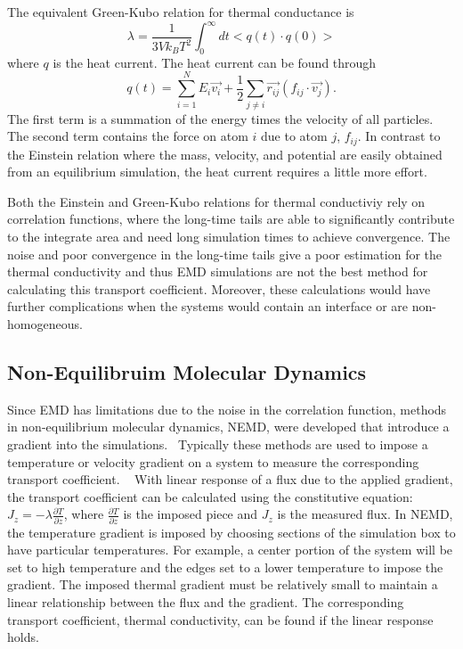 The equivalent Green-Kubo relation for thermal conductance is
\begin{equation}
    \lambda = \frac{1}{3Vk_BT^2}\int^\infty_0 dt <q(t) \cdot q(0)>
\end{equation}
where $q$ is the heat current.
The heat current can be found through
\begin{equation}
    q(t) = \sum^N_{i=1} E_i \vec{v_i} + \frac{1}{2}\sum_{j \neq i} \vec{r_{ij}} (f_{ij} \cdot \vec{v_j}).
\end{equation}
The first term is a summation of the energy times the velocity of all particles. The second term contains the force on atom $i$ due to atom $j$, $f_{ij}$.
In contrast to the Einstein relation where the mass, velocity, and potential are easily obtained from an equilibrium simulation, the heat current requires a little more effort.

Both the Einstein and Green-Kubo relations for thermal conductiviy rely on correlation functions, where the long-time tails are able to significantly contribute to the integrate area and need long simulation times to achieve convergence.
The noise and poor convergence in the long-time tails give a poor estimation for the thermal conductivity and thus EMD simulations are not the best method for calculating this transport coefficient.
Moreover, these calculations would have further complications when the systems would contain an interface or are non-homogeneous.

\subsection{Non-Equilibruim Molecular Dynamics}
Since EMD has limitations due to the noise in the correlation function, methods in non-equilibrium molecular dynamics, NEMD, were developed that introduce a gradient into the simulations.~\cite{Backer:2005sf,Hess:2002nr,Picalek:2009rz, Vasquez:2004ty}
Typically these methods are used to impose a temperature or velocity gradient on a system to measure the corresponding transport coefficient. ~\cite{Evans:1982oq, Erpenbeck:1984qe, Evans:1986nx, Vogelsang:1988qv, Maginn:1993kl, Hess:2002nr, Schelling:2002dp, Berthier:2002ai, Evans:2002tg, Vasquez:2004ty, Backer:2005sf, Jiang:2008hc, Picalek:2009rz}
With linear response of a flux due to the applied gradient, the transport coefficient can be calculated using the constitutive equation: $J_z = -\lambda \frac{\partial T}{\partial z}$, where $\frac{\partial T}{\partial z}$ is the imposed piece and $J_z$ is the measured flux.
In NEMD, the temperature gradient is imposed by choosing sections of the simulation box to have particular temperatures. For example, a center portion of the system will be set to high temperature and the edges set to a lower temperature to impose the gradient. 
The imposed thermal gradient must be relatively small to maintain a linear relationship between the flux and the gradient. 
The corresponding transport coefficient, thermal conductivity, can be found if the linear response holds.

